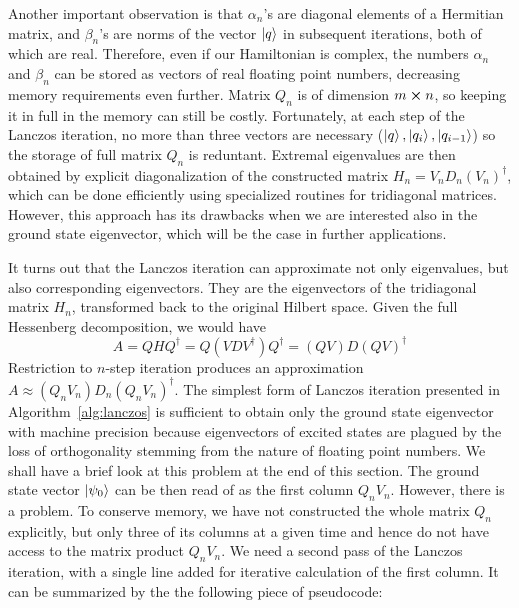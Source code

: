 Another important observation is that \(\alpha_n\)'s are diagonal elements of a Hermitian matrix, and \(\beta_n\)'s are
norms of the vector \(\ket{q}\) in subsequent iterations, both of which are real. Therefore, even if our Hamiltonian is
complex, the numbers \(\alpha_n\) and \(\beta_n\) can be stored as vectors of real floating point numbers, decreasing
memory requirements even further.
Matrix \(Q_n\) is of dimension \(m \cross n\), so keeping it in full in the memory can still be costly. Fortunately,
at each step of the Lanczos iteration, no more than three vectors are necessary (\(\ket{q},\ket{q_i},\ket{q_{i-1}}\))
so the storage of full matrix \(Q_n\) is reduntant. Extremal eigenvalues are then obtained by explicit diagonalization
of the constructed matrix \(H_n = V_n D_n (V_n)^{\dagger}\), which can be done efficiently using specialized routines
for tridiagonal matrices. However, this approach has its drawbacks when we are interested also in the ground state
eigenvector, which will be the case in further applications.

It turns out that the Lanczos iteration can approximate not only eigenvalues,
but also corresponding eigenvectors. They are the eigenvectors of the tridiagonal matrix \(H_n\), transformed back
to the original Hilbert space. Given the full Hessenberg decomposition, we would have
\begin{equation}
	A = Q H Q^{\dagger} = Q (VDV^{\dagger}) Q^{\dagger} = (QV)D(QV)^{\dagger}
	\label{eq:factorization}
\end{equation}
Restriction to \(n\)-step iteration produces an approximation \(A\approx (Q_n V_n)D_n(Q_n V_n)^{\dagger}\).
The simplest form of Lanczos iteration presented in Algorithm~\ref{alg:lanczos} is sufficient to obtain
only the ground state eigenvector with machine precision because eigenvectors of excited states are plagued
by the loss of orthogonality stemming from the nature of floating point numbers. We shall have a brief look at this problem
at the end of this section.
The ground state vector \(\ket{\psi_0}\) can be then read of as the first column \(Q_n V_n\). However, there is a problem.
To conserve memory, we have not constructed the whole matrix \(Q_n\) explicitly, but only three of its columns
at a given time and hence do not have access to the matrix product \(Q_n V_n\). We need a second pass of the Lanczos
iteration, with a single line added for iterative calculation of the first column. It can be summarized by the
the following piece of pseudocode:

